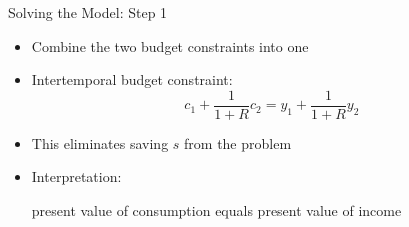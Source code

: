 \documentclass[10pt,aspectratio=169]{beamer}
\begin{document}
\begin{frame}{Solving the Model: Step 1}

\begin{itemize}
    \item Combine the two budget constraints into one
    \vspace{0.3cm}

    \item Intertemporal budget constraint:
    \[
    c_1 + \frac{1}{1+R} c_2
    =
    y_1 + \frac{1}{1+R} y_2
    \]
    \vspace{-0.3cm}

    \item This eliminates saving \(s\) from the problem
    \vspace{0.3cm}

    \item Interpretation:
    \begin{itemize}
        \itemvso present value of consumption
        \itemvso equals present value of income
    \end{itemize}
\end{itemize}

\end{frame}
\end{document}
